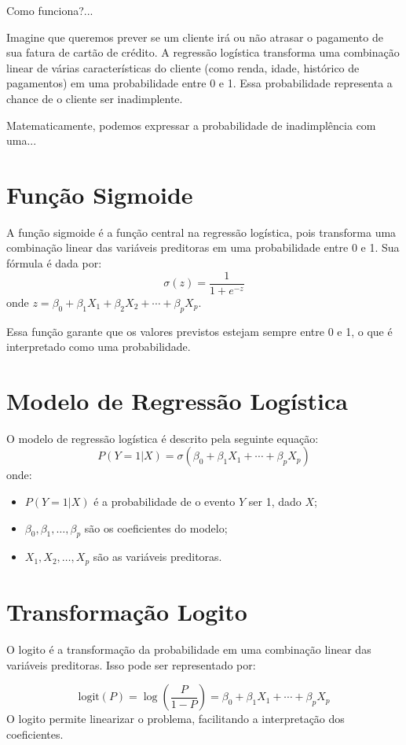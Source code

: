 \documentclass{abntpuc}
\begin{document}
Como funciona?...

Imagine que queremos prever se um cliente irá ou não atrasar o pagamento de sua fatura de cartão de crédito. A regressão logística transforma uma combinação linear de várias características do cliente (como renda, idade, histórico de pagamentos) em uma probabilidade entre 0 e 1. Essa probabilidade representa a chance de o cliente ser inadimplente.

Matematicamente, podemos expressar a probabilidade de inadimplência com uma...

\section{Função Sigmoide}

A função sigmoide é a função central na regressão logística, pois transforma uma combinação linear das variáveis preditoras em uma probabilidade entre 0 e 1. Sua fórmula é dada por:
\[
\sigma(z) = \frac{1}{1 + e^{-z}}
\]
onde \( z = \beta_0 + \beta_1 X_1 + \beta_2 X_2 + \cdots + \beta_p X_p \).

Essa função garante que os valores previstos estejam sempre entre 0 e 1, o que é interpretado como uma probabilidade.

\section{Modelo de Regressão Logística}

O modelo de regressão logística é descrito pela seguinte equação:
\[
P(Y=1|X) = \sigma(\beta_0 + \beta_1 X_1 + \cdots + \beta_p X_p)
\]
onde:
\begin{itemize}
    \item \(P(Y=1|X)\) é a probabilidade de o evento \(Y\) ser 1, dado \(X\);
    \item \(\beta_0, \beta_1, \ldots, \beta_p\) são os coeficientes do modelo;
    \item \(X_1, X_2, \ldots, X_p\) são as variáveis preditoras.
\end{itemize}

\section{Transformação Logito}
O logito é a transformação da probabilidade em 
uma combinação linear das variáveis preditoras.
Isso pode ser representado por:

\[
\text{logit}(P) = \log\left(\frac{P}{1-P}\right) = \beta_0 + \beta_1 X_1 + \cdots + \beta_p X_p
\]
O logito permite linearizar o problema, facilitando a interpretação dos coeficientes.
\end{document}

